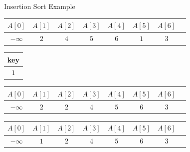 \begin{frame}{Insertion Sort Example}
\vspace{1cm}
\begin{tabular}{|c|c|c|c|c|c|c|c|}
\hline
$A[0]$ & $A[1]$ & $A[2]$ & $A[3]$ & $A[4]$ & $A[5]$ & $A[6]$\\
\hline
$-\infty$ & \cellcolor{yellow}$2$ &\cellcolor{yellow} $4$ &\cellcolor{yellow} $5$ &\cellcolor{yellow} $6$ &\cellcolor{orange} $1$ & $3$ \\
\hline
\end{tabular}
\vspace{1cm}
\begin{table}[!hbt]
\begin{tabular}{|c|}
\hline key\\
\hline $1$\\
\hline
\end{tabular}\hspace{1cm}
%
\begin{tabular}{|c|c|c|c|c|c|c|c|}
\hline
$A[0]$ & $A[1]$ & $A[2]$ & $A[3]$ & $A[4]$ & $A[5]$ & $A[6]$\\
\hline
$-\infty$ & $2$ & $2$ & $4$ & $5$ &\cellcolor{orange} $6$ & $3$ \\
\hline
\end{tabular}
\end{table}


\begin{tabular}{|c|c|c|c|c|c|c|c|}
\hline
$A[0]$ & $A[1]$ & $A[2]$ & $A[3]$ & $A[4]$ & $A[5]$ & $A[6]$\\
\hline
$-\infty$ & \cellcolor{statalegreen}$1$ & \cellcolor{statalegreen}$2$ &\cellcolor{statalegreen} $4$ & \cellcolor{statalegreen}$5$ & \cellcolor{statalegreen}$6$ & $3$ \\
\hline
\end{tabular}

\end{frame}

